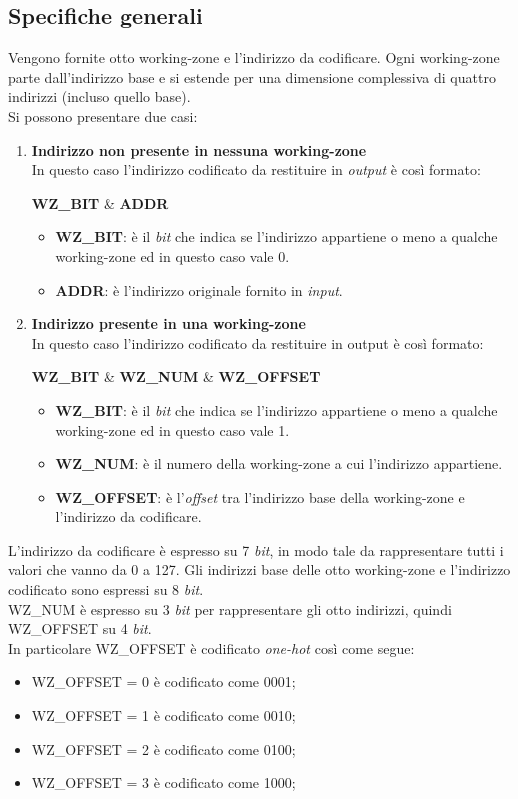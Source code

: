 \documentclass{article}
\begin{document}
\subsection{Specifiche generali}
Vengono fornite otto working-zone e l'indirizzo da codificare. Ogni working-zone parte dall'indirizzo base e si estende per una dimensione complessiva di quattro indirizzi (incluso quello base).\\Si possono presentare due casi:
\begin{enumerate}
\item\textbf{Indirizzo non presente in nessuna working-zone}\\
In questo caso l'indirizzo codificato da restituire in \textit{output} è così formato:
\begin{center}
\textbf{WZ\_BIT} \& \textbf{ADDR}
\end{center}
\begin{itemize}
\item\textbf{WZ\_BIT}: è il \textit{\textit{bit}} che indica se l'indirizzo appartiene o meno a qualche working-zone ed in questo caso vale 0.
\item\textbf{ADDR}: è l'indirizzo originale fornito in \textit{input}.
\end{itemize}
\item\textbf{Indirizzo presente in una working-zone}\\
In questo caso l'indirizzo codificato da restituire in output è così formato:
\begin{center}
\textbf{WZ\_BIT} \& \textbf{WZ\_NUM} \& \textbf{WZ\_OFFSET}
\end{center}
\begin{itemize}
\item\textbf{WZ\_BIT}: è il \textit{\textit{bit}} che indica se l'indirizzo appartiene o meno a qualche working-zone ed in questo caso vale 1.
\item\textbf{WZ\_NUM}: è il numero della working-zone a cui l'indirizzo appartiene.
\item\textbf{WZ\_OFFSET}: è l'\textit{offset} tra l'indirizzo base della working-zone e l'indirizzo da codificare.
\end{itemize}
\end{enumerate}
L'indirizzo da codificare è espresso su 7 \textit{\textit{bit}}, in modo tale da rappresentare tutti i valori che vanno da 0 a 127. Gli indirizzi base delle otto working-zone e l'indirizzo codificato sono espressi su 8 \textit{\textit{bit}}.\\
WZ\_NUM è espresso su 3 \textit{\textit{bit}} per rappresentare gli otto indirizzi, quindi WZ\_OFFSET su 4 \textit{\textit{bit}}.\\
In particolare WZ\_OFFSET è codificato \textit{one-hot} così come segue:
\begin{itemize}
\item WZ\_OFFSET = 0 è codificato come 0001;
\item WZ\_OFFSET = 1 è codificato come 0010;
\item WZ\_OFFSET = 2 è codificato come 0100;
\item WZ\_OFFSET = 3 è codificato come 1000;
\end{itemize}
\pagebreak
\end{document}
